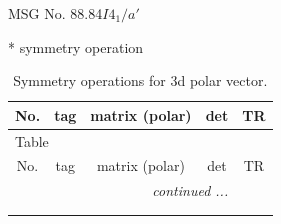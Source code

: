\documentclass[fleqn,8pt]{jsarticle}
\begin{document}
\setcounter{MaxMatrixCols}{32}

\renewcommand{\tablename}{Table~}
\renewcommand{\figurename}{Figure~}
\begin{center}
\LARGE
MSG No. 88.84\quad$I4_{1}/a'$
\end{center}
* symmetry operation
\renewcommand{\arraystretch}{1.3}
\begin{longtable}{ccccc}
\caption{Symmetry operations for 3d polar vector.}
 \\
 \hline \hline
No. & tag & matrix (polar) & det & TR \\ \hline \endfirsthead

\multicolumn{4}{l}{\tablename\ \thetable{}} \\
 \hline \hline
No. & tag & matrix (polar) & det & TR \\ \hline \endhead

 \hline \hline
\multicolumn{4}{r}{\footnotesize\it continued ...} \\ \endfoot

 \hline \hline
\multicolumn{4}{r}{} \\ \endlastfoot


\end{longtable}
\end{document}
